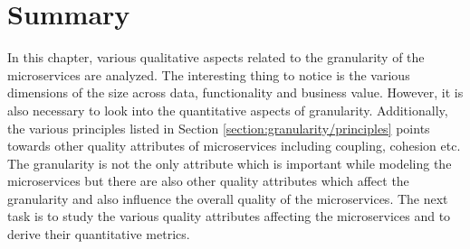 \section{Summary}\label{section:granularity/problem_statement}
In this chapter, various qualitative aspects related to the granularity of the microservices are analyzed. The interesting thing to notice is the various dimensions of the size across data, functionality and business value. However, it is also necessary to look into the quantitative aspects of granularity. Additionally, the various principles listed in Section \ref{section:granularity/principles} points towards other quality attributes of microservices including coupling, cohesion etc. The granularity is not the only attribute which is important while modeling the microservices but there are also other quality attributes which affect the granularity and also influence the overall quality of the microservices. The next task is to study the various quality attributes affecting the microservices and to derive their quantitative metrics.

 